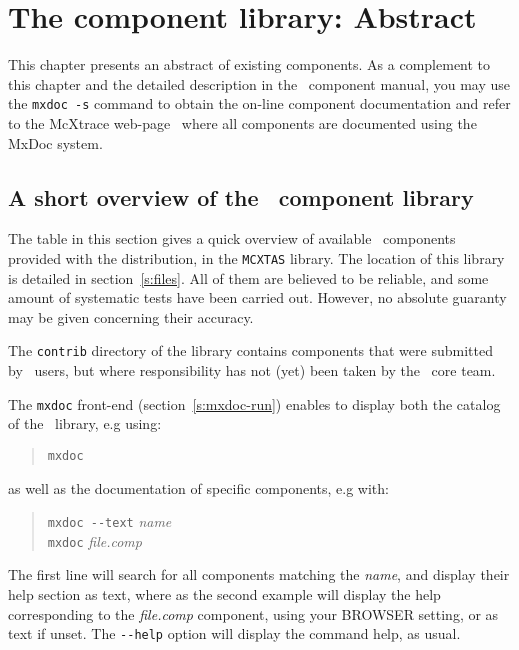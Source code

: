 \chapter{The component library: Abstract}
\label{s:components}

This chapter presents an abstract of existing components.
As a complement to this chapter and the
detailed description in the \MCX\ component manual,
you may use the \verb+mxdoc -s+ command to obtain the on-line
component documentation and refer to the McXtrace web-page~\cite{mcxtrace_webpage}
where all components are documented using the MxDoc system.

\section{A short overview of the \MCX\ component library}
\label{s:comp-overview}

The table in this section gives a quick overview of available \MCX\ components
provided with the distribution, in the \verb+MCXTAS+ library. The
location of this library is detailed in section~\ref{s:files}.
All of them are believed to be reliable, and some amount of systematic
tests have been carried out.
However, no absolute guaranty may be given concerning their accuracy.

The \verb+contrib+ directory of the library contains components
that were submitted by \MCX\ users,
but where responsibility has not (yet) been taken by the \MCX\ core team. 


The \verb+mxdoc+ front-end (section~\ref{s:mxdoc-run}) enables to display both the
catalog of the \MCX\ library, e.g using: 
\begin{quote}
  \verb|mxdoc|
\end{quote}
as well as the documentation of specific components, e.g with:
\begin{quote}
  \verb|mxdoc --text| \textit{name} \\
  \verb|mxdoc| \textit{file.comp}
\end{quote}
The first line will search for all components matching the \textit{name}, and display their help section as text, where as the second example will display the help corresponding to the \textit{file.comp} component, using your BROWSER setting, or as text if unset. The \verb+--help+ option will display the command help, as usual.

